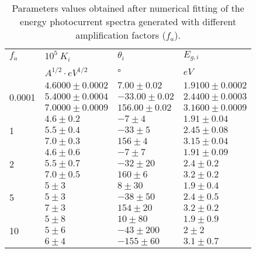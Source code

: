 \begin{table}[h]
\small
\centering
\begin{tabular}{ p{1cm}|p{}|p{}| p{}}
\toprule
 $f_a$ & $10^5 \ K_i$ & $\theta _i$ &  $E_{g,i}$\\
 & $A^{1/2} \cdot eV^{1/2}$ & ° & $eV$\\
\midrule
\multirow{3}{*}{0.0001} & $4.6000 \pm 0.0002$    & $7.00 \pm 0.02$ &   $1.9100 \pm 0.0002$\\
                                   & $5.4000 \pm 0.0004$    & $-33.00 \pm 0.02$ &   $2.4400 \pm 0.0003$\\
                                   & $7.0000 \pm 0.0009$    & $156.00 \pm 0.02$ &   $3.1600 \pm 0.0009$\\
                                   
\midrule
\multirow{3}{*}{1}        & $4.6 \pm 0.2$    & $-7 \pm 4$ &   $1.91 \pm 0.04$\\
                                   & $5.5 \pm 0.4$    & $-33 \pm 5$ &   $2.45 \pm 0.08$\\
                                   & $7.0 \pm 0.3$    & $156 \pm 4$ &   $3.15 \pm 0.04$\\
                                  
\midrule
\multirow{3}{*}{2}        & $4.6 \pm 0.6$    & $-7 \pm 7$ &   $1.91 \pm 0.09$\\
                                   & $5.5 \pm 0.7$    & $-32 \pm 20$ &   $2.4 \pm 0.2$\\
                                   & $7.0 \pm 0.5$    & $160 \pm 6$ &   $3.2 \pm 0.2$\\      
                                   
\midrule
\multirow{3}{*}{5}        & $5 \pm 3$    & $8 \pm 30$ &   $1.9 \pm 0.4$\\
                                   & $5 \pm 3$    & $-38 \pm 50$ &   $2.4 \pm 0.5$\\
                                   & $7 \pm 3$    & $154 \pm 20$ &   $3.2 \pm 0.2$\\        
                                   
\midrule
\multirow{3}{*}{10}        & $5 \pm 8$    & $10 \pm 80$ &   $1.9 \pm 0.9$\\
                                   & $5 \pm 6$    & $-43 \pm 200$ &   $2 \pm 2$\\
                                   & $6 \pm 4$    & $-155 \pm 60$ &   $3.1 \pm 0.7$\\                                   


\bottomrule
\end{tabular}
\caption{Parameters values obtained after numerical fitting of the energy 
photocurrent spectra generated with different amplification factors ($f_a$).}
\label{table:result_fit_noise}
\end{table}
 
